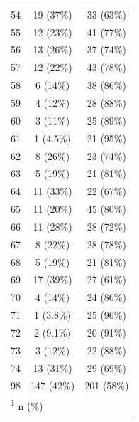 \documentclass[
  letterpaper,
  DIV=11,
  numbers=noendperiod]{scrartcl}
\begin{document}
\begin{longtable}{lcc}
\hspace{1em}54 & 19 (37\%) & 33 (63\%)\\
\hspace{1em}55 & 12 (23\%) & 41 (77\%)\\
\hspace{1em}56 & 13 (26\%) & 37 (74\%)\\
\hspace{1em}57 & 12 (22\%) & 43 (78\%)\\
\hspace{1em}58 & 6 (14\%) & 38 (86\%)\\
\hspace{1em}59 & 4 (12\%) & 28 (88\%)\\
\hspace{1em}60 & 3 (11\%) & 25 (89\%)\\
\hspace{1em}61 & 1 (4.5\%) & 21 (95\%)\\
\hspace{1em}62 & 8 (26\%) & 23 (74\%)\\
\hspace{1em}63 & 5 (19\%) & 21 (81\%)\\
\hspace{1em}64 & 11 (33\%) & 22 (67\%)\\
\hspace{1em}65 & 11 (20\%) & 45 (80\%)\\
\hspace{1em}66 & 11 (28\%) & 28 (72\%)\\
\hspace{1em}67 & 8 (22\%) & 28 (78\%)\\
\hspace{1em}68 & 5 (19\%) & 21 (81\%)\\
\hspace{1em}69 & 17 (39\%) & 27 (61\%)\\
\hspace{1em}70 & 4 (14\%) & 24 (86\%)\\
\hspace{1em}71 & 1 (3.8\%) & 25 (96\%)\\
\hspace{1em}72 & 2 (9.1\%) & 20 (91\%)\\
\hspace{1em}73 & 3 (12\%) & 22 (88\%)\\
\hspace{1em}74 & 13 (31\%) & 29 (69\%)\\
\hspace{1em}98 & 147 (42\%) & 201 (58\%)\\*
\multicolumn{3}{l}{\rule{0pt}{1em}\textsuperscript{1} n (\%)}\\
\end{longtable}
\end{document}

